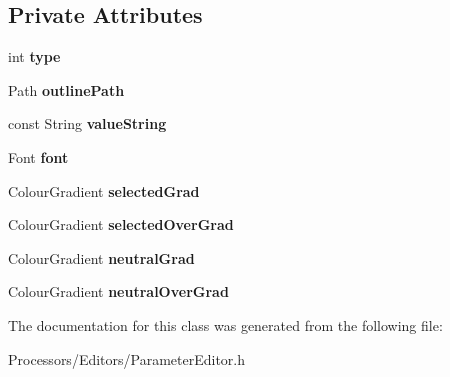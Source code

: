 \subsection*{Private Attributes}
\begin{DoxyCompactItemize}
\item 
\hypertarget{classParameterButton_a55676c2d0264727d097514ce4be4bb67}{int {\bfseries type}}\label{classParameterButton_a55676c2d0264727d097514ce4be4bb67}

\item 
\hypertarget{classParameterButton_a22bda9a20291345d25e2402d8e1e7837}{Path {\bfseries outline\-Path}}\label{classParameterButton_a22bda9a20291345d25e2402d8e1e7837}

\item 
\hypertarget{classParameterButton_ad71f8a5d0b0ad16923b0f29c78cc17ad}{const String {\bfseries value\-String}}\label{classParameterButton_ad71f8a5d0b0ad16923b0f29c78cc17ad}

\item 
\hypertarget{classParameterButton_ab7554783d5d6864ea8facb93db1ab1fc}{Font {\bfseries font}}\label{classParameterButton_ab7554783d5d6864ea8facb93db1ab1fc}

\item 
\hypertarget{classParameterButton_a0bcf00e16032a383e93a87a633959e1e}{Colour\-Gradient {\bfseries selected\-Grad}}\label{classParameterButton_a0bcf00e16032a383e93a87a633959e1e}

\item 
\hypertarget{classParameterButton_a2efe962907ce0355310f58ff2d1320fc}{Colour\-Gradient {\bfseries selected\-Over\-Grad}}\label{classParameterButton_a2efe962907ce0355310f58ff2d1320fc}

\item 
\hypertarget{classParameterButton_a3b547b9434b12999f741babbb5c855f2}{Colour\-Gradient {\bfseries neutral\-Grad}}\label{classParameterButton_a3b547b9434b12999f741babbb5c855f2}

\item 
\hypertarget{classParameterButton_a1e2978b82beada5f5e9881619399efdb}{Colour\-Gradient {\bfseries neutral\-Over\-Grad}}\label{classParameterButton_a1e2978b82beada5f5e9881619399efdb}

\end{DoxyCompactItemize}


The documentation for this class was generated from the following file\-:\begin{DoxyCompactItemize}
\item 
Processors/\-Editors/Parameter\-Editor.\-h\end{DoxyCompactItemize}
